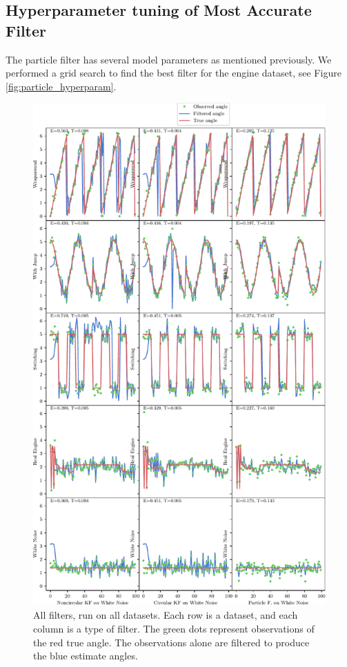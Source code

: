 \documentclass[11pt]{amsart}
\begin{document}
\subsection{Hyperparameter tuning of Most Accurate Filter}

The particle filter has several model parameters as mentioned previously. We performed a grid search
to find the best filter for the engine dataset, see Figure \ref{fig:particle_hyperparam}.


\begin{figure}[htp]
    \centering
    \includegraphics[width=.95\textwidth]{actual_paper_graphs/all.pdf}\hfill
    \caption{All filters, run on all datasets. Each row is a dataset, and each column is a type of filter. The green dots represent observations of the red true angle. The observations alone are filtered to produce the blue estimate angles.}
    \label{fig:all_filters}
\end{figure}
\end{document}
